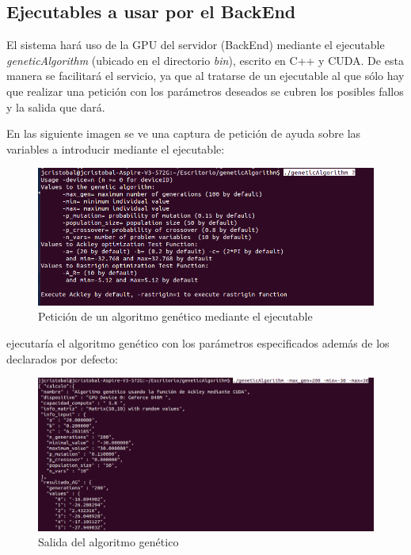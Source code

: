 \bigskip
\subsection{Ejecutables a usar por el BackEnd}
\bigskip

El sistema hará uso de la GPU del servidor (BackEnd) mediante el ejecutable \textit{geneticAlgorithm} (ubicado en el directorio \textit{bin}), escrito en C++ y CUDA. De esta manera se facilitará el servicio, ya que al tratarse de un ejecutable al que sólo hay que realizar una petición con los parámetros deseados se cubren los posibles fallos y la salida que dará. 

En las siguiente imagen se ve una captura de petición de ayuda sobre las variables a introducir mediante el ejecutable:

\bigskip
\begin{figure}[h]
	\centering
	\includegraphics[width=1\linewidth]{../images/peticion_ejecutable}
	\caption[Petición de un algoritmo genético mediante el ejecutable]{Petición de un algoritmo genético mediante el ejecutable}
	\label{fig:peticion_ejecutable}
\end{figure}

\bigskip
ejecutaría el algoritmo genético con los parámetros especificados además de los declarados por defecto:

\bigskip
\begin{figure}[h]
	\centering
	\includegraphics[width=1\linewidth]{../images/salida_ejecutable}
	\caption[Salida del algoritmo genético]{Salida del algoritmo genético}
	\label{fig:salida_ejecutable}
\end{figure}


